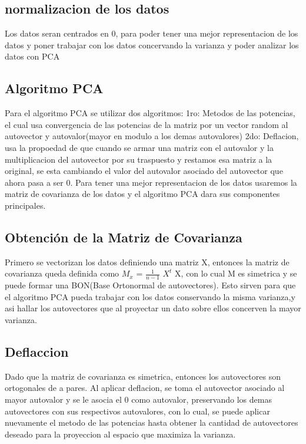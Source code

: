 \subsection{normalizacion de los datos}
Los datos seran centrados en 0, para poder tener una mejor representacion de los
datos y poner trabajar con los datos concervando la varianza y poder analizar
los datos con PCA

\subsection{Algoritmo PCA}
Para el algoritmo PCA se utilizar dos algoritmos:
1ro: Metodos de las potencias, el cual usa convergencia de las potencias de
la matriz por un vector random al autovector y  autovalor(mayor en modulo a los
demas autovalores)
2do: Deflacion, usa la propoedad de que cuando se armar una matriz con el autovalor
y la multiplicacion del autovector por su traspuesto y restamos esa matriz a la
original, se esta cambiando el valor del autovalor asociado del autovector que
ahora pasa a ser 0.
Para tener una mejor representacion de los datos usaremos la matriz de
covarianza de los datos y el algoritmo PCA dara sus componentes principales. 

\subsection{Obtención de la Matriz de Covarianza}
Primero se vectorizan los datos definiendo una matriz X, entonces la matriz de
covarianza queda definida como $M_{x}$ = $\frac{1}{n-1}$ $X^{t}$ X, con lo cual
M es simetrica y se puede formar una BON(Base Ortonormal de autovectores). Esto sirven
para que el algoritmo PCA pueda trabajar con los datos conservando la misma varianza,y asi hallar los autovectores que al proyectar un dato sobre
ellos concerven la mayor varianza.

\subsection{Deflaccion}
Dado que la matriz de covarianza es simetrica, entonces los autovectores son ortogonales de a pares. Al aplicar deflacion, se toma el autovector asociado al mayor autovalor y se le asocia el 0 como autovalor, preservando los demas autovectores con sus respectivos autovalores, con lo cual, se puede aplicar nuevamente el metodo de las potencias hasta obtener la cantidad de autovectores deseado para la proyeccion al espacio que maximiza la varianza.

